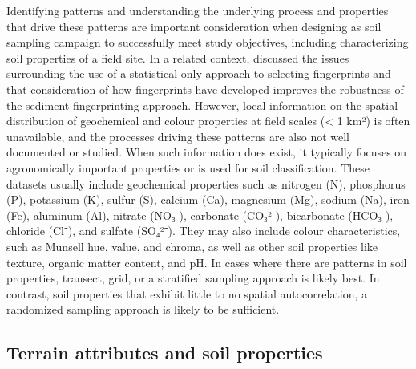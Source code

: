 \documentclass[
  number]{elsarticle}
\begin{document}
Identifying patterns and understanding the underlying process and
properties that drive these patterns are important consideration when
designing as soil sampling campaign to successfully meet study
objectives, including characterizing soil properties of a field site. In
a related context, \citep{koiter2013a} discussed the issues surrounding
the use of a statistical only approach to selecting fingerprints and
that consideration of how fingerprints have developed improves the
robustness of the sediment fingerprinting approach. However, local
information on the spatial distribution of geochemical and colour
properties at field scales (\textless{} 1 km²) is often unavailable, and
the processes driving these patterns are also not well documented or
studied. When such information does exist, it typically focuses on
agronomically important properties or is used for soil classification.
These datasets usually include geochemical properties such as nitrogen
(N), phosphorus (P), potassium (K), sulfur (S), calcium (Ca), magnesium
(Mg), sodium (Na), iron (Fe), aluminum (Al), nitrate (NO₃⁻), carbonate
(CO₃²⁻), bicarbonate (HCO₃⁻), chloride (Cl⁻), and sulfate (SO₄²⁻). They
may also include colour characteristics, such as Munsell hue, value, and
chroma, as well as other soil properties like texture, organic matter
content, and pH. In cases where there are patterns in soil properties,
transect, grid, or a stratified sampling approach is likely best. In
contrast, soil properties that exhibit little to no spatial
autocorrelation, a randomized sampling approach is likely to be
sufficient.

\subsection{Terrain attributes and soil
properties}\label{terrain-attributes-and-soil-properties}
\end{document}
